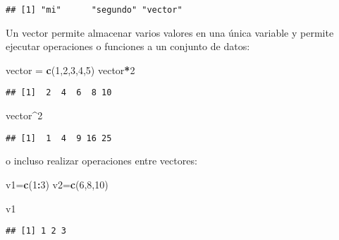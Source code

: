 \documentclass[
]{book}
\newenvironment{Shaded}{\begin{snugshade}}{\end{snugshade}}
\newcommand{\DecValTok}[1]{\textcolor[rgb]{0.00,0.00,0.81}{#1}}
\newcommand{\FunctionTok}[1]{\textcolor[rgb]{0.13,0.29,0.53}{\textbf{#1}}}
\newcommand{\NormalTok}[1]{#1}
\newcommand{\OtherTok}[1]{\textcolor[rgb]{0.56,0.35,0.01}{#1}}
\newcommand{\SpecialCharTok}[1]{\textcolor[rgb]{0.81,0.36,0.00}{\textbf{#1}}}
\begin{document}
\begin{verbatim}
## [1] "mi"      "segundo" "vector"
\end{verbatim}

Un vector permite almacenar varios valores en una única variable y
permite ejecutar operaciones o funciones a un conjunto de datos:

\begin{Shaded}
\begin{Highlighting}[]
\NormalTok{vector }\OtherTok{=} \FunctionTok{c}\NormalTok{(}\DecValTok{1}\NormalTok{,}\DecValTok{2}\NormalTok{,}\DecValTok{3}\NormalTok{,}\DecValTok{4}\NormalTok{,}\DecValTok{5}\NormalTok{)}
\NormalTok{vector}\SpecialCharTok{*}\DecValTok{2}
\end{Highlighting}
\end{Shaded}

\begin{verbatim}
## [1]  2  4  6  8 10
\end{verbatim}

\begin{Shaded}
\begin{Highlighting}[]
\NormalTok{vector}\SpecialCharTok{\^{}}\DecValTok{2}
\end{Highlighting}
\end{Shaded}

\begin{verbatim}
## [1]  1  4  9 16 25
\end{verbatim}

o incluso realizar operaciones entre vectores:

\begin{Shaded}
\begin{Highlighting}[]
\NormalTok{v1}\OtherTok{=}\FunctionTok{c}\NormalTok{(}\DecValTok{1}\SpecialCharTok{:}\DecValTok{3}\NormalTok{)}
\NormalTok{v2}\OtherTok{=}\FunctionTok{c}\NormalTok{(}\DecValTok{6}\NormalTok{,}\DecValTok{8}\NormalTok{,}\DecValTok{10}\NormalTok{)}
\end{Highlighting}
\end{Shaded}

\begin{Shaded}
\begin{Highlighting}[]
\NormalTok{v1}
\end{Highlighting}
\end{Shaded}

\begin{verbatim}
## [1] 1 2 3
\end{verbatim}
\end{document}
